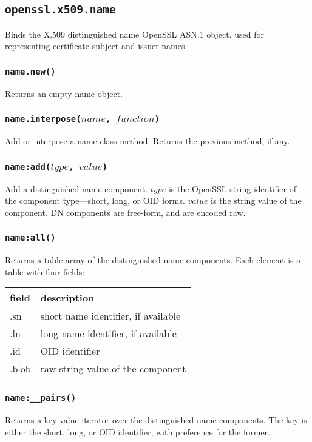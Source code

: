 \documentclass[11pt, oneside]{memoir}
\newcommand*{\fn}[1]{\texttt{#1}\xspace}
\newcounter{toccols}
\newenvironment{Module}[1]{
	\subsection{\texttt{#1}}
	\addtocontents{toc}{
		\protect\begin{multicols}{\value{toccols}}
	}
}{
	\addtocontents{toc}{\protect\end{multicols}}
}
\begin{document}
\begin{Module}{openssl.x509.name}

Binds the X.509 distinguished name OpenSSL ASN.1 object, used for representing certificate subject and issuer names.

\subsubsection[\fn{name.new}]{\fn{name.new()}}

Returns an empty name object.

\subsubsection[\fn{name.interpose}]{\fn{name.interpose($name$, $function$)}}

Add or interpose a name class method. Returns the previous method, if any.

\subsubsection[\fn{name:add}]{\fn{name:add($type$, $value$)}}

Add a distinguished name component. $type$ is the OpenSSL string identifier of the component type---short, long, or OID forms. $value$ is the string value of the component. DN components are free-form, and are encoded raw.

\subsubsection[\fn{name:all}]{\fn{name:all()}}

Returns a table array of the distinguished name components. Each element is a table with four fields:

\begin{tabular}{ l | l}
field & description\\\hline
.sn & short name identifier, if available\\
.ln & long name identifier, if available\\
.id & OID identifier\\
.blob & raw string value of the component
\end{tabular}

\subsubsection[\fn{name:\_\_pairs}]{\fn{name:\_\_pairs()}}

Returns a key-value iterator over the distinguished name components. The key is either the short, long, or OID identifier, with preference for the former.

\end{Module}
\end{document}
